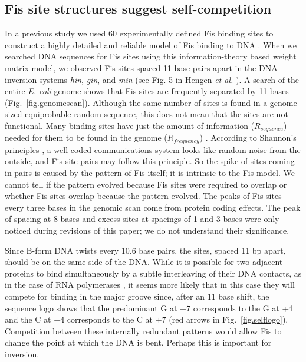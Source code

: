 \documentclass[doublespacing]{narfront}
\newcommand{\fig}[1]{Fig.~\ref{#1}} %
\newcommand{\figmargin}[1]{\marginpar{\textcolor{blue}{$\Leftarrow$Fig \ref{#1}}}}
\newcommand{\rsequence}{R_{sequence}}
\newcommand{\rfrequency}{R_{frequency}}
\begin{document}
\subsection*{Fis site structures suggest self-competition}

In a previous study we used 60 experimentally defined
Fis binding sites to construct a highly detailed and reliable
model of Fis binding to DNA
\cite{Hengen.fisinfo}.
When we searched DNA sequences for Fis sites
using
this
information-theory based weight matrix model,
we observed
Fis sites spaced 11 base pairs apart in
the DNA inversion systems
\emph{hin}, \emph{gin}, and \emph{min}
(see Fig. 5 in Hengen \emph{et al.} \cite{Hengen.fisinfo}).
A search of the entire \emph{E. coli} genome
shows that Fis sites are frequently separated by 11 bases
(\fig{fig.genomescan}).\figmargin{fig.genomescan}
Although the same number of sites is found in a genome-sized
equiprobable random sequence,
this does not mean that the sites are not functional.
Many binding sites have just the amount of information
($\rsequence$)
needed for them
to be found in the genome
($\rfrequency$)
\cite{Schneider1986}.
According to Shannon's principles
\cite{Shannon1948},
a well-coded communications system looks like random noise from the
outside,
and Fis site pairs may follow this principle.
So the spike of sites coming in pairs is caused by the pattern
of Fis itself; it is intrinsic to the Fis model.
We cannot tell if
the pattern evolved because Fis sites were required to overlap
or whether
Fis sites overlap because the pattern evolved.
The peaks of Fis sites every three bases
in the genomic scan come from protein coding effects.
The peak of
spacing at 8 bases and
excess sites at
spacings of 1 and 3 bases were only
noticed during revisions of this paper; we do not understand
their significance.

Since B-form DNA twists every 10.6 base pairs,
the sites,
spaced 11 bp apart,
should be on the same side of the DNA.
While it is possible for two adjacent proteins
to bind simultaneously by a subtle interleaving of their DNA contacts,
as in the case of RNA polymerases
\cite{Goodrich.McClure1991,Strainic.deHaseth2000},
it seems more likely that
in this case
they will compete for binding in the major groove
since, after an 11 base shift,
the sequence logo shows that the predominant G at $-7$ corresponds
to the G at +4 and the C at $-4$ corresponds
to the C at $+7$
(red arrows in \fig{fig.selflogo}).\figmargin{fig.selflogo}
Competition between these internally redundant patterns
\cite{Schneider.Mastronarde.malign}
would allow Fis to change
the point at which the DNA is bent.
Perhaps this is important for inversion.
\end{document}
